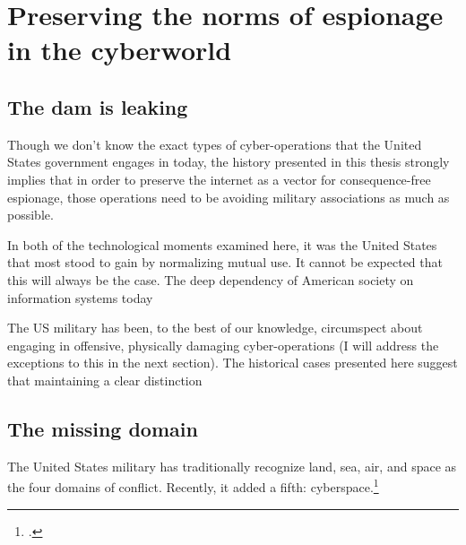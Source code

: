 \documentclass{report}
\begin{document}

\section{Preserving the norms of espionage in the cyberworld}
\subsection{The dam is leaking}

Though we don't know the exact types of cyber-operations that the United States government engages in today, the history presented in this thesis strongly implies that in order to preserve the internet as a vector for consequence-free espionage, those operations need to be avoiding military associations as much as possible.

In both of the technological moments examined here, it was the United States that most stood to gain by normalizing mutual use. It cannot be expected that this will always be the case. The deep dependency of American society on information systems today

The US military has been, to the best of our knowledge, circumspect about engaging in offensive, physically damaging cyber-operations (I will address the exceptions to this in the next section). The historical cases presented here suggest that maintaining a clear distinction

\subsection{The missing domain}
The United States military has traditionally recognize land, sea, air, and space as the four domains of conflict. Recently, it added a fifth: cyberspace.\footcite{carafano_americas_2018}
\end{document}
